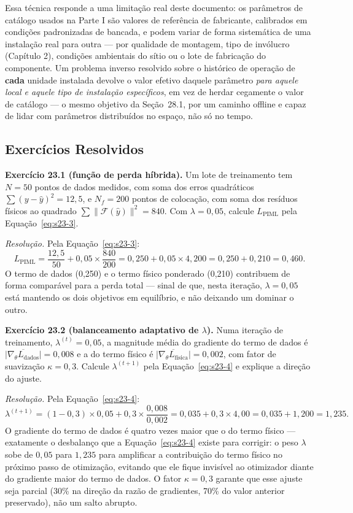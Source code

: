 \documentclass[12pt,a4paper]{article}
\numberwithin{equation}{section}
\numberwithin{table}{section}
\numberwithin{figure}{section}
\begin{document}
{	Essa técnica responde a uma limitação real deste documento: os parâmetros de catálogo usados na Parte I são valores de referência de fabricante, calibrados em condições padronizadas de bancada, e podem variar de forma sistemática de uma instalação real para outra — por qualidade de montagem, tipo de invólucro (Capítulo 2), condições ambientais do sítio ou o lote de fabricação do componente. Um problema inverso resolvido sobre o histórico de operação de \textbf{cada} unidade instalada devolve o valor efetivo daquele parâmetro \textit{para aquele local e aquele tipo de instalação específicos}, em vez de herdar cegamente o valor de catálogo — o mesmo objetivo da Seção~28.1, por um caminho offline e capaz de lidar com parâmetros distribuídos no espaço, não só no tempo.

	\subsection{Exercícios Resolvidos}

	\textbf{Exercício 23.1 (função de perda híbrida).} Um lote de
	treinamento tem $N=50$ pontos de dados medidos, com soma dos erros
	quadráticos $\sum (y-\hat{y})^2 = 12{,}5$, e $N_f=200$ pontos de
	colocação, com soma dos resíduos físicos ao quadrado
	$\sum \| \mathcal{F}(\hat{y}) \|^2 = 840$. Com $\lambda=0{,}05$,
	calcule $L_{\text{PIML}}$ pela Equação~\eqref{eq:s23-3}.

	\emph{Resolução.} Pela Equação~\eqref{eq:s23-3}:
	$$L_{\text{PIML}} = \frac{12{,}5}{50} + 0{,}05 \times \frac{840}{200}
	= 0{,}250 + 0{,}05 \times 4{,}200 = 0{,}250 + 0{,}210 = 0{,}460.$$
	O termo de dados (0,250) e o termo físico ponderado (0,210)
	contribuem de forma comparável para a perda total --- sinal de que,
	nesta iteração, $\lambda=0{,}05$ está mantendo os dois objetivos em
	equilíbrio, e não deixando um dominar o outro.

	\textbf{Exercício 23.2 (balanceamento adaptativo de $\lambda$).} Numa
	iteração de treinamento, $\lambda^{(t)}=0{,}05$, a magnitude média do
	gradiente do termo de dados é $\overline{|\nabla_\theta
	L_{\text{dados}}|}=0{,}008$ e a do termo físico é
	$\overline{|\nabla_\theta L_{\text{física}}|}=0{,}002$, com fator de
	suavização $\kappa=0{,}3$. Calcule $\lambda^{(t+1)}$ pela
	Equação~\eqref{eq:s23-4} e explique a direção do ajuste.

	\emph{Resolução.} Pela Equação~\eqref{eq:s23-4}:
	$$\lambda^{(t+1)} = (1-0{,}3)\times 0{,}05 + 0{,}3 \times
	\frac{0{,}008}{0{,}002} = 0{,}035 + 0{,}3 \times 4{,}00 = 0{,}035 +
	1{,}200 = 1{,}235.$$
	O gradiente do termo de dados é quatro vezes maior que o do termo
	físico --- exatamente o desbalanço que a Equação~\eqref{eq:s23-4}
	existe para corrigir: o peso $\lambda$ sobe de $0{,}05$ para
	$1{,}235$ para amplificar a contribuição do termo físico no próximo
	passo de otimização, evitando que ele fique invisível ao otimizador
	diante do gradiente maior do termo de dados. O fator $\kappa=0{,}3$
	garante que esse ajuste seja parcial (30\% na direção da razão de
	gradientes, 70\% do valor anterior preservado), não um salto abrupto.

}
\end{document}
